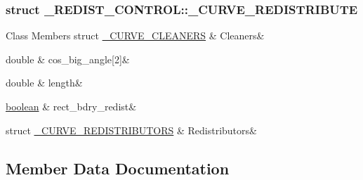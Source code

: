 \subsubsection{struct \+\_\+\+R\+E\+D\+I\+S\+T\+\_\+\+C\+O\+N\+T\+R\+OL\+:\+:\+\_\+\+C\+U\+R\+V\+E\+\_\+\+R\+E\+D\+I\+S\+T\+R\+I\+B\+U\+TE}
\begin{DoxyFields}{Class Members}
struct \hyperlink{struct___r_e_d_i_s_t___c_o_n_t_r_o_l_1_1___c_u_r_v_e___r_e_d_i_s_t_r_i_b_u_t_e_1_1___c_u_r_v_e___c_l_e_a_n_e_r_s}{\+\_\+\+C\+U\+R\+V\+E\+\_\+\+C\+L\+E\+A\+N\+E\+RS}\hypertarget{struct___r_e_d_i_s_t___c_o_n_t_r_o_l_a9d0dfb9b27343ad04d4c6e922694bf3b}{}\label{struct___r_e_d_i_s_t___c_o_n_t_r_o_l_a9d0dfb9b27343ad04d4c6e922694bf3b}
&
Cleaners&
\\
\hline

double\hypertarget{struct___r_e_d_i_s_t___c_o_n_t_r_o_l_ac767b72483002d07883aa1b445caa530}{}\label{struct___r_e_d_i_s_t___c_o_n_t_r_o_l_ac767b72483002d07883aa1b445caa530}
&
cos\+\_\+big\+\_\+angle\mbox{[}2\mbox{]}&
\\
\hline

double\hypertarget{struct___r_e_d_i_s_t___c_o_n_t_r_o_l_af3a17e1cb65a8ac90173b98ae66ff55b}{}\label{struct___r_e_d_i_s_t___c_o_n_t_r_o_l_af3a17e1cb65a8ac90173b98ae66ff55b}
&
length&
\\
\hline

\hyperlink{cdecs_8h_ad048433382a936258fb49e2ec4f148e1}{boolean}\hypertarget{struct___r_e_d_i_s_t___c_o_n_t_r_o_l_ae5f4e26d6737caaa11b432393bd64d61}{}\label{struct___r_e_d_i_s_t___c_o_n_t_r_o_l_ae5f4e26d6737caaa11b432393bd64d61}
&
rect\+\_\+bdry\+\_\+redist&
\\
\hline

struct \hyperlink{struct___r_e_d_i_s_t___c_o_n_t_r_o_l_1_1___c_u_r_v_e___r_e_d_i_s_t_r_i_b_u_t_e_1_1___c_u_r_v_e___r_e_d_i_s_t_r_i_b_u_t_o_r_s}{\+\_\+\+C\+U\+R\+V\+E\+\_\+\+R\+E\+D\+I\+S\+T\+R\+I\+B\+U\+T\+O\+RS}\hypertarget{struct___r_e_d_i_s_t___c_o_n_t_r_o_l_a53cf128978767c85a5c13fae5ca599f8}{}\label{struct___r_e_d_i_s_t___c_o_n_t_r_o_l_a53cf128978767c85a5c13fae5ca599f8}
&
Redistributors&
\\
\hline

\end{DoxyFields}


\subsection{Member Data Documentation}
